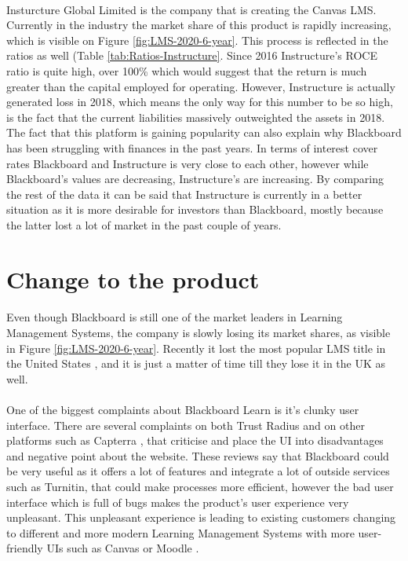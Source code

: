\documentclass[]{article}
\begin{document}
\paragraph{}
Insturcture Global Limited is the company that is creating the Canvas LMS. Currently in the industry the market share of this product is rapidly increasing, which is visible on Figure \ref{fig:LMS-2020-6-year}. This process is reflected in the ratios as well (Table \ref{tab:Ratios-Instructure}. Since 2016 Instructure's ROCE ratio is quite high, over 100\% which would suggest that the return is much greater than the capital employed for operating. However, Instructure is actually generated loss in 2018, which means the only way for this number to be so high, is the fact that the current liabilities massively outweighted the assets in 2018. The fact that this platform is gaining popularity can also explain why Blackboard has been struggling with finances in the past years. In terms of interest cover rates Blackboard and Instructure is very close to each other, however while Blackboard's values are decreasing, Instructure's are increasing. By comparing the rest of the data it can be said that Instructure is currently in a better situation as it is more desirable for investors than Blackboard, mostly because the latter lost a lot of market in the past couple of years. 

\section{Change to the product}

\paragraph{}
Even though Blackboard is still one of the market leaders in Learning Management Systems, the company is slowly losing its market shares, as visible in Figure \ref{fig:LMS-2020-6-year}. Recently it lost the most popular LMS title in the United States \cite{Canvas-overtakes-BB}, and it is just a matter of time till they lose it in the UK as well. 

\paragraph{}
One of the biggest complaints about Blackboard Learn is it's clunky user interface. There are several complaints on both Trust Radius \cite{BB-Reviews} and on other platforms such as Capterra \cite{Capterra-BB-Reviews}, that criticise and place the UI into disadvantages and negative point about the website. These reviews say that Blackboard could be very useful as it offers a lot of features and integrate a lot of outside services such as Turnitin, that could make processes more efficient, however the bad user interface which is full of bugs makes the product's user experience very unpleasant. This unpleasant experience is leading to existing customers changing to different and more modern Learning Management Systems with more user-friendly UIs such as Canvas or Moodle \cite{BB-Alternatives}.
\end{document}
